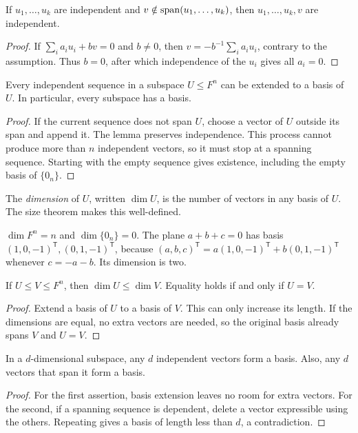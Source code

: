 \begin{lemma}
If $u_1,\ldots,u_k$ are independent and
$v\notin\operatorname{span}(u_1,\ldots,u_k)$, then $u_1,\ldots,u_k,v$ are independent.
\end{lemma}
\begin{proof}
If $\sum_i a_i u_i+bv=0$ and $b\ne0$, then
$v=-b^{-1}\sum_i a_i u_i$, contrary to the assumption.
Thus $b=0$, after which independence of the $u_i$ gives all $a_i=0$.
\end{proof}

\begin{theorem}
Every independent sequence in a subspace $U\leq F^n$ can be extended to
a basis of $U$. In particular, every subspace has a basis.
\end{theorem}
\begin{proof}
If the current sequence does not span $U$, choose a vector of $U$ outside
its span and append it. The lemma preserves independence.
This process cannot produce more than $n$ independent vectors, so it
must stop at a spanning sequence. Starting with the empty sequence gives
existence, including the empty basis of $\{0_n\}$.
\end{proof}

\begin{definition}
The \emph{dimension} of $U$, written $\dim U$, is the number of vectors
in any basis of $U$. The size theorem makes this well-defined.
\end{definition}

\begin{example}
$\dim F^n=n$ and $\dim\{0_n\}=0$.
The plane $a+b+c=0$ has basis
$(1,0,-1)^{\mathsf T},(0,1,-1)^{\mathsf T}$, because
$(a,b,c)^{\mathsf T}=a(1,0,-1)^{\mathsf T}
+b(0,1,-1)^{\mathsf T}$ whenever $c=-a-b$.
Its dimension is two.
\end{example}

\begin{proposition}
If $U\leq V\leq F^n$, then $\dim U\leq\dim V$.
Equality holds if and only if $U=V$.
\end{proposition}
\begin{proof}
Extend a basis of $U$ to a basis of $V$. This can only increase its
length. If the dimensions are equal, no extra vectors are needed, so
the original basis already spans $V$ and $U=V$.
\end{proof}

\begin{corollary}
In a $d$-dimensional subspace, any $d$ independent vectors form a basis.
Also, any $d$ vectors that span it form a basis.
\end{corollary}
\begin{proof}
For the first assertion, basis extension leaves no room for extra vectors.
For the second, if a spanning sequence is dependent, delete a vector
expressible using the others. Repeating gives a basis of length less
than $d$, a contradiction.
\end{proof}

